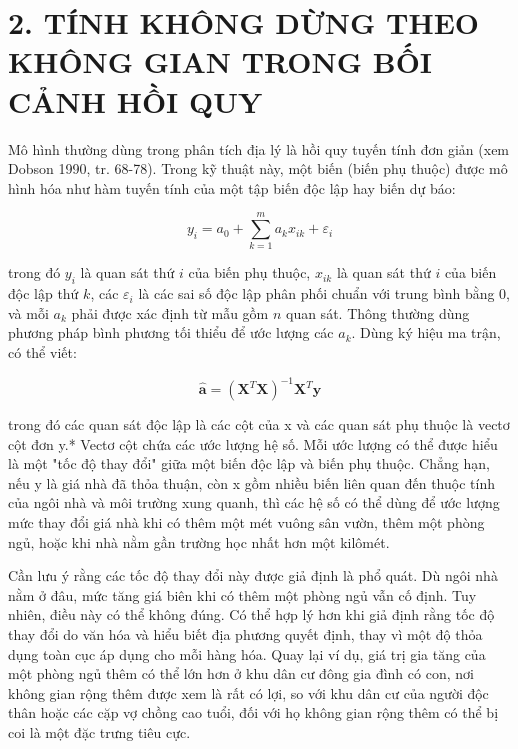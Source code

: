 \section{2. TÍNH KHÔNG DỪNG THEO KHÔNG GIAN TRONG BỐI CẢNH HỒI QUY}

Mô hình thường dùng trong phân tích địa lý là hồi quy tuyến tính đơn giản (xem Dobson 1990, tr. 68-78). Trong kỹ thuật này, một biến (biến phụ thuộc) được mô hình hóa như hàm tuyến tính của một tập biến độc lập hay biến dự báo:

\begin{equation*}y_i = a_0 + \sum_{k=1}^{m} a_k x_{ik} + \varepsilon_i \tag{1}\end{equation*}

trong đó \(y_i\) là quan sát thứ \(i\) của biến phụ thuộc, \(x_{ik}\) là quan sát thứ \(i\) của biến độc lập thứ \(k\), các \(\varepsilon_i\) là các sai số độc lập phân phối chuẩn với trung bình bằng 0, và mỗi \(a_k\) phải được xác định từ mẫu gồm \(n\) quan sát. Thông thường dùng phương pháp bình phương tối thiểu để ước lượng các \(a_k\). Dùng ký hiệu ma trận, có thể viết:

\begin{equation*}\hat{\mathbf{a}} = (\mathbf{X}^T \mathbf{X})^{-1} \mathbf{X}^T \mathbf{y} \tag{2}\end{equation*}

trong đó các quan sát độc lập là các cột của x và các quan sát phụ thuộc là vectơ cột đơn y.* Vectơ cột chứa các ước lượng hệ số. Mỗi ước lượng có thể được hiểu là một "tốc độ thay đổi" giữa một biến độc lập và biến phụ thuộc. Chẳng hạn, nếu y là giá nhà đã thỏa thuận, còn x gồm nhiều biến liên quan đến thuộc tính của ngôi nhà và môi trường xung quanh, thì các hệ số có thể dùng để ước lượng mức thay đổi giá nhà khi có thêm một mét vuông sân vườn, thêm một phòng ngủ, hoặc khi nhà nằm gần trường học nhất hơn một kilômét.

Cần lưu ý rằng các tốc độ thay đổi này được giả định là phổ quát. Dù ngôi nhà nằm ở đâu, mức tăng giá biên khi có thêm một phòng ngủ vẫn cố định. Tuy nhiên, điều này có thể không đúng. Có thể hợp lý hơn khi giả định rằng tốc độ thay đổi do văn hóa và hiểu biết địa phương quyết định, thay vì một độ thỏa dụng toàn cục áp dụng cho mỗi hàng hóa. Quay lại ví dụ, giá trị gia tăng của một phòng ngủ thêm có thể lớn hơn ở khu dân cư đông gia đình có con, nơi không gian rộng thêm được xem là rất có lợi, so với khu dân cư của người độc thân hoặc các cặp vợ chồng cao tuổi, đối với họ không gian rộng thêm có thể bị coi là một đặc trưng tiêu cực.

